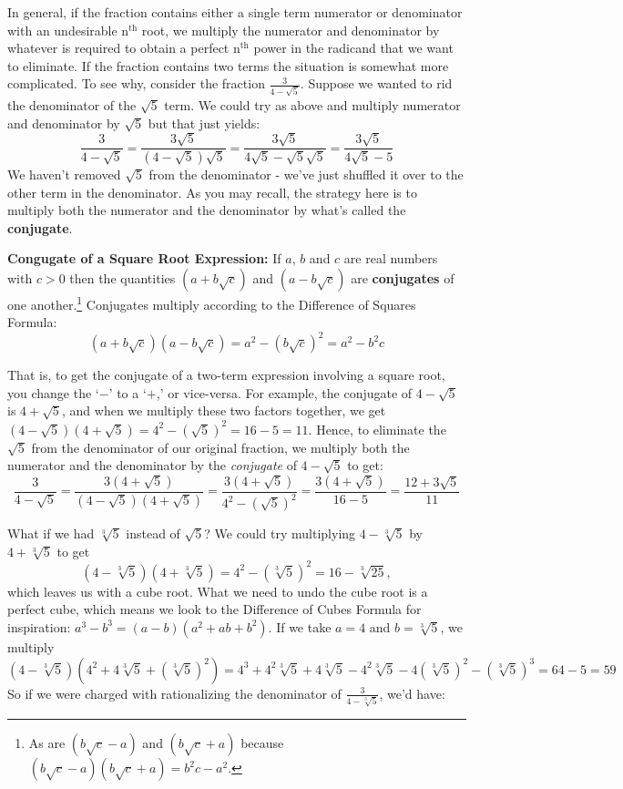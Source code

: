 \documentclass{ximera}
\begin{document}
In general, if the fraction contains either a single term numerator or denominator with an undesirable $\text{n}^{\text{th}}$ root, we multiply the numerator and denominator by whatever is required to obtain a perfect $\text{n}^{\text{th}}$ power in the radicand that we want to eliminate. If the fraction contains two terms the situation is somewhat more complicated.  To see why, consider the fraction $\frac{3}{4 - \sqrt{5}}$.  Suppose we wanted to rid the denominator of the $\sqrt{5}$ term.  We could try as above and multiply numerator and denominator by $\sqrt{5}$ but that just yields: \[ \frac{3}{4 - \sqrt{5}} = \frac{3\sqrt{5}}{(4 - \sqrt{5})\sqrt{5}} = \frac{3\sqrt{5}}{4\sqrt{5} - \sqrt{5}\sqrt{5}} = \frac{3\sqrt{5}}{4\sqrt{5} - 5}\] We haven't removed $\sqrt{5}$ from the denominator - we've just shuffled it over to the other term in the denominator.  As you may recall, the strategy here is to multiply both the numerator and the denominator by what's called the \textbf{conjugate}.  

 


\begin{definition}\label{squarerootconj} \textbf{Congugate of a Square Root Expression:}  If $a$, $b$ and $c$ are real numbers with $c > 0$ then the quantities $(a + b \sqrt{c})$ and $(a - b\sqrt{c})$ are \textbf{conjugates} of one another.\footnote{As are $(b\sqrt{c} -a)$ and $(b\sqrt{c} + a)$ because $(b\sqrt{c} -a)(b\sqrt{c} + a) = b^2c - a^2$.}  Conjugates multiply according to the Difference of Squares Formula:  \[ (a + b \sqrt{c})(a - b\sqrt{c}) = a^2 - (b \sqrt{c})^2 = a^2 - b^2c\]
\end{definition}

 

That is, to get the conjugate of a two-term expression involving a square root, you change the `$-$' to a `$+$,' or vice-versa.  For example, the conjugate of $4 - \sqrt{5}$ is $4 + \sqrt{5}$, and when we multiply these two factors together, we get $(4 - \sqrt{5})(4 + \sqrt{5}) = 4^2 - (\sqrt{5})^2 = 16 - 5 = 11$.  Hence, to eliminate the $\sqrt{5}$ from the denominator of our original fraction, we multiply both the numerator and the denominator by the \textit{conjugate} of $4-\sqrt{5}$ to get: \[\frac{3}{4 - \sqrt{5}} = \frac{3 (4 + \sqrt{5})}{(4 - \sqrt{5})(4 + \sqrt{5})} = \frac{3 (4 + \sqrt{5})}{4^2 - (\sqrt{5})^2} = \frac{3(4 + \sqrt{5})}{16 - 5} = \frac{12 + 3\sqrt{5}}{11}\] 

What if we had $\sqrt[3]{5}$ instead of $\sqrt{5}$?  We could try multiplying $4 - \sqrt[3]{5}$ by $4 + \sqrt[3]{5}$ to get  \[(4 - \sqrt[3]{5})(4 + \sqrt[3]{5}) = 4^2 - (\sqrt[3]{5})^2 = 16 - \sqrt[3]{25},\] which leaves us with a cube root.  What we need to undo the cube root is a perfect cube, which means we look to the Difference of Cubes Formula for inspiration:  $a^3 - b^3 = (a-b)(a^2+ab+b^2)$.  If we take $a = 4$ and $b = \sqrt[3]{5}$, we multiply \[ (4 - \sqrt[3]{5})(4^2 + 4\sqrt[3]{5} + (\sqrt[3]{5})^2) = 4^3 + 4^2\sqrt[3]{5} + 4 \sqrt[3]{5} - 4^2\sqrt[3]{5}-4(\sqrt[3]{5})^2 - (\sqrt[3]{5})^3 = 64 - 5 = 59\] So if we were charged with rationalizing the denominator of $\frac{3}{4 - \sqrt[3]{5}}$, we'd have:
\end{document}
